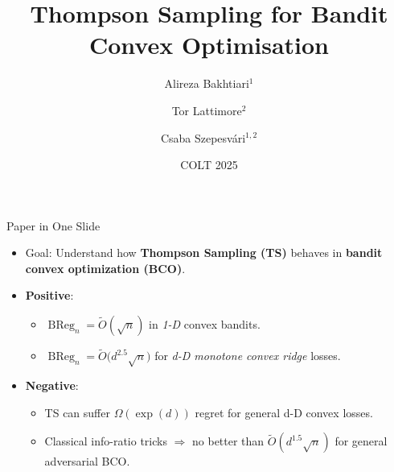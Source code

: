 \documentclass{beamer}
\title[Thompson Sampling for BCO]{Thompson Sampling for Bandit Convex Optimisation}
\author{Alireza Bakhtiari$^1$ \and Tor Lattimore$^2$ \and Csaba Szepesvári$^{1,2}$}
\institute{University of Alberta$^1$ \quad \& \quad Google DeepMind$^2$}
\date{COLT 2025}
\newcommand{\BReg}{\operatorname{BReg}}
\begin{document}
\begin{frame}
    \titlepage
\end{frame}

\begin{frame}{Paper in One Slide}
    \begin{itemize}
        \item \alert{Goal}: Understand how \textbf{Thompson Sampling (TS)} behaves in \textbf{bandit convex optimization (BCO)}.
        \item \textbf{Positive}:
              \begin{itemize}
                  \item $\BReg_n = \widetilde{O}(\sqrt{n})$ in \emph{1-D} convex bandits.
                  \item $\BReg_n = \widetilde{O}\!\bigl(d^{2.5}\sqrt{n}\bigr)$ for \emph{d-D monotone convex ridge} losses.
              \end{itemize}
        \item \textbf{Negative}:
              \begin{itemize}
                  \item TS can suffer \(\Omega(\exp(d))\) regret for general d-D convex losses.
                  \item Classical info-ratio tricks \(\Rightarrow\) no better than \(\widetilde{O}(d^{1.5}\sqrt{n})\) for general adversarial BCO.
              \end{itemize}
    \end{itemize}
\end{frame}
\end{document}

